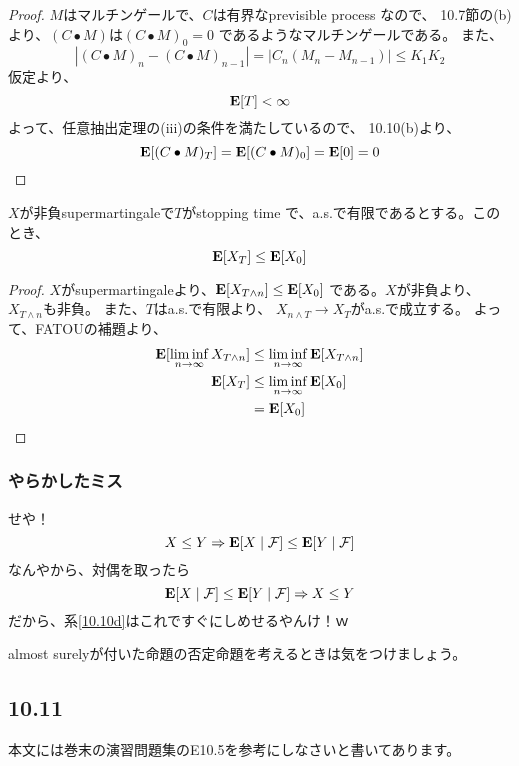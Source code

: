         \begin{proof}
        $M$はマルチンゲールで、$C$は有界なprevisible process なので、
        10.7節の(b)より、$(C \bullet M)$は$(C \bullet M)_0 = 0$
        であるようなマルチンゲールである。
        また、
        \[
          |(C \bullet M)_n - (C \bullet M)_{n-1}| = |C_n(M_n - M_{n-1})| \leq K_1K_2
        \]
        仮定より、
        \[{\mathbf{E}}[T] < \infty\]
        よって、任意抽出定理の(iii)の条件を満たしているので、
        10.10(b)より、
        \[
          {\mathbf{E}}[(C \bullet M)_T] = {\mathbf{E}}[(C \bullet M)_0] = {\mathbf{E}}[0] = 0
        \]

        \end{proof}

        \begin{cor}\label{10.10d}
          $X$が非負supermartingaleで$T$がstopping time で、a.s.で有限であるとする。このとき、
          \[{\mathbf{E}}[X_T] \leq {\mathbf{E}}[X_0]\]
        \end{cor}

        \begin{proof}
          $X$がsupermartingaleより、${\mathbf{E}}[X_{T \wedge n}] \leq {\mathbf{E}}[X_0]$
          である。$X$が非負より、$X_{T \wedge n}$も非負。
          また、$T$はa.s.で有限より、
          $X_{n \wedge T} \rightarrow X_T$がa.s.で成立する。
          よって、FATOUの補題より、
          \begin{align*}
            {\mathbf{E}}[\liminf_{n \to \infty}X_{T \wedge n}] &\leq \liminf_{n \to \infty}{\mathbf{E}}[X_{T \wedge n}]\\
            {\mathbf{E}}[X_T] &\leq \liminf_{n \to \infty}{\mathbf{E}}[X_0]\\
            &={\mathbf{E}}[X_0]
          \end{align*}
        \end{proof}

      \subsubsection{やらかしたミス}
        せや！
        \[
          X \leq Y \Rightarrow {\mathbf{E}}[X \mid \mathcal{F}] \leq {\mathbf{E}}[Y \mid \mathcal{F}]
        \]
        なんやから、対偶を取ったら
        \[
          {\mathbf{E}}[X \mid \mathcal{F}] \leq {\mathbf{E}}[Y \mid \mathcal{F}]  \Rightarrow X \leq Y
        \]
        だから、系\ref{10.10d}はこれですぐにしめせるやんけ！ｗ

        almost surelyが付いた命題の否定命題を考えるときは気をつけましょう。

    \subsection{10.11}
      本文には巻末の演習問題集のE10.5を参考にしなさいと書いてあります。
